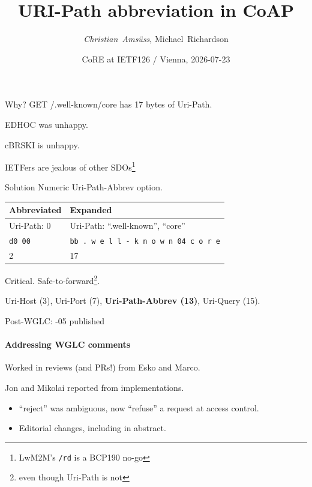

\title{URI-Path abbreviation in CoAP}
\subtitle{}
\author{\textit{Christian~Amsüss}, Michael~Richardson}
\date{CoRE at IETF126 / Vienna, 2026-07-23}



\frame{\titlepage}

\begin{frame}{\color{gray}Why?}\Large\color{gray}
  GET /.well-known/core has 17 bytes of Uri-Path.

  \bigskip

  EDHOC was unhappy.

  \bigskip

  cBRSKI is unhappy.

  \bigskip

  IETFers are jealous of other SDOs\footnote{LwM2M's \texttt{/rd} is a BCP190 no-go}
\end{frame}

\begin{frame}{\color{gray}Solution}\Large\color{gray}
  Numeric Uri-Path-Abbrev option.

  \bigskip

  \begin{tabular}{l|l}
    Abbreviated & Expanded \\ \hline
    Uri-Path: 0 \hspace{1cm} & Uri-Path: ``.well-known'', ``core'' \\
    \texttt{d0 00} & \texttt{bb . w e l l - k n o w n 04 c o r e} \\
    2 & 17 \\
  \end{tabular}

  \bigskip

  Critical. Safe-to-forward\footnote{even though Uri-Path is not}.

  \bigskip

  Uri-Host (3), Uri-Port (7), \textbf{Uri-Path-Abbrev (13)}, Uri-Query (15).
\end{frame}

\begin{frame}{Post-WGLC: -05 published}\Large
  \framesubtitle{Addressing WGLC comments}

  Worked in reviews (and PRs!) from Esko and Marco.
  
  \bigskip

  Jon and Mikolai reported from implementations.

  \bigskip

  \begin{itemize}
    \item ``reject'' was ambiguous, now ``refuse'' a request at access control.
      \bigskip
    \item Editorial changes, including in abstract.
  \end{itemize}
\end{frame}

